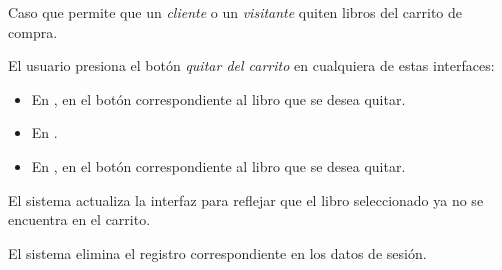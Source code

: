 %
%

{
  Caso que permite que un \textit{cliente} o un \textit{visitante} quiten
  libros del carrito de compra.

  \begin{trayectoriaPrincipal}

    \item El usuario presiona el botón \textit{quitar del carrito} en
      cualquiera de estas interfaces:
      \begin{itemize}
        \item En , en el botón correspondiente
          al libro que se desea quitar.
        \item En .
        \item En , en el botón
          correspondiente al libro que se desea quitar.
      \end{itemize}

    \item El sistema actualiza la interfaz para reflejar que el libro
      seleccionado ya no se encuentra en el carrito.

    \item El sistema elimina el registro correspondiente en los datos de
      sesión.

  \end{trayectoriaPrincipal}
}
